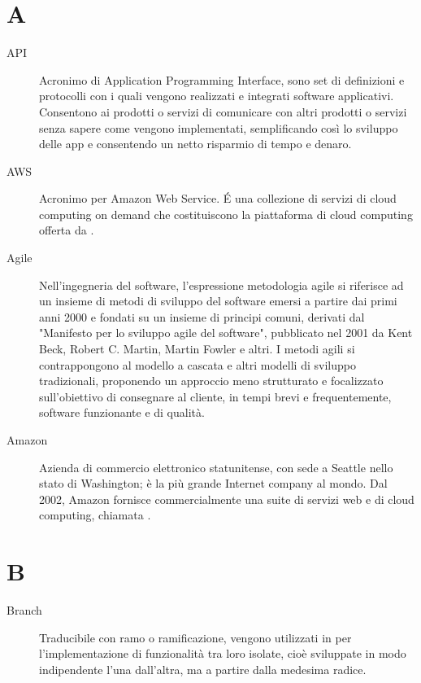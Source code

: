 \documentclass[a4paper, oneside]{article}
\begin{document}
\copertina{}


\newpage
\newpage
\tableofcontents

\newpage

\section{A}
\begin{description}
  \item[API] Acronimo di Application Programming Interface, sono set di definizioni e protocolli con i quali vengono realizzati e integrati software applicativi. Consentono ai prodotti o servizi di comunicare con altri prodotti o servizi senza sapere come vengono implementati, semplificando così lo sviluppo delle app e consentendo un netto risparmio di tempo e denaro.
  \item[AWS] Acronimo per Amazon Web Service. É una collezione di servizi di cloud computing on demand che costituiscono la piattaforma di cloud computing offerta da .
  \item[Agile] Nell'ingegneria del software, l'espressione metodologia agile si riferisce ad un insieme di metodi di sviluppo del software emersi a partire dai primi anni 2000 e fondati su un insieme di principi comuni, derivati dal "Manifesto per lo sviluppo agile del software", pubblicato nel 2001 da Kent Beck, Robert C. Martin, Martin Fowler e altri. I metodi agili si contrappongono al modello a cascata e altri modelli di sviluppo tradizionali, proponendo un approccio meno strutturato e focalizzato sull'obiettivo di consegnare al cliente, in tempi brevi e frequentemente, software funzionante e di qualità.
  \item[Amazon] Azienda di commercio elettronico statunitense, con sede a Seattle nello stato di Washington; è la più grande Internet company al mondo. Dal 2002, Amazon fornisce commercialmente una suite di servizi web e di cloud computing, chiamata .
\end{description}
\newpage
\section{B}
\begin{description}
  \item[Branch] Traducibile con ramo o ramificazione, vengono utilizzati in  per l'implementazione di funzionalità tra loro isolate, cioè sviluppate in modo indipendente l'una dall'altra, ma a partire dalla medesima radice.
\end{description}
\newpage
\end{document}

